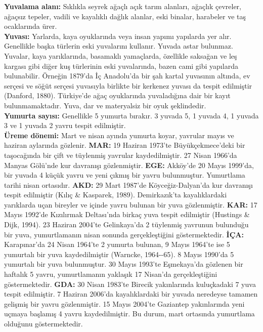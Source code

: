 \documentclass[
  10.5pt,
  a4paper,
  DIV=11,
  numbers=noendperiod,
  twocolumn]{scrreprt}
\begin{document}
\textbf{Yuvalama alanı:} Sıklıkla seyrek ağaçlı açık tarım alanları,
ağaçlık çevreler, ağaçsız tepeler, vadili ve kayalıklı dağlık alanlar,
eski binalar, harabeler ve taş ocaklarında ürer.\\
\textbf{Yuvası:} Yarlarda, kaya oyuklarında veya insan yapımı yapılarda
yer alır. Genellikle başka türlerin eski yuvalarını kullanır. Yuvada
astar bulunmaz. Yuvalar, kaya yarıklarında, basamaklı yamaçlarda,
özellikle saksağan ve leş kargası gibi diğer kuş türlerinin eski
yuvalarında, bazen cami gibi yapılarda bulunabilir. Örneğin 1879'da İç
Anadolu'da bir şah kartal yuvasının altında, ev serçesi ve söğüt serçesi
yuvasıyla birlikte bir kerkenez yuvası da tespit edilmiştir (Danford,
1880). Türkiye'de ağaç oyuklarında yuvaladığına dair bir kayıt
bulunmamaktadır. Yuva, dar ve materyalsiz bir oyuk şeklindedir.\\
\textbf{Yumurta sayısı:} Genellikle 5 yumurta bırakır. 3 yuvada 5, 1
yuvada 4, 1 yuvada 3 ve 1 yuvada 2 yavru tespit edilmiştir.\\
\textbf{Üreme dönemi:} Mart ve nisan ayında yumurta koyar, yavrular
mayıs ve haziran aylarında gözlenir. \textbf{MAR:} 19 Haziran 1973'te
Büyükçekmece'deki bir taşocağında bir çift ve tüylenmiş yavrular
kaydedilmiştir. 27 Nisan 1966'da Manyas Gölü'nde kur davranışı
gözlenmiştir. \textbf{EGE:} Akköy'de 20 Mayıs 1999'da, bir yuvada 4
küçük yavru ve yeni çıkmış bir yavru bulunmuştur. Yumurtlama tarihi
nisan ortasıdır. \textbf{AKD:} 29 Mart 1987'de Köyceğiz-Dalyan'da kur
davranışı tespit edilmiştir (Kılıç \& Kasparek, 1989). Demirkazık'ta
kayalıklardaki yarıklarda uçan bireyler ve içinde yavru bulunan bir yuva
gözlenmiştir. \textbf{KAR:} 17 Mayıs 1992'de Kızılırmak Deltası'nda
birkaç yuva tespit edilmiştir (Hustings \& Dijk, 1994). 23 Haziran
2004'te Gelinkaya'da 2 tüylenmiş yavrunun bulunduğu bir yuva,
yumurtlamanın nisan sonunda gerçekleştiğini göstermektedir.
\textbf{İÇA:} Karapınar'da 24 Nisan 1964'te 2 yumurta bulunan, 9 Mayıs
1964'te ise 5 yumurtalı bir yuva kaydedilmiştir (Warncke, 1964-\/-65). 8
Mayıs 1990'da 5 yumurtalı bir yuva bulunmuştur. 30 Mayıs 1993'te
Eşmekaya'da gözlenen bir haftalık 5 yavru, yumurtlamanın yaklaşık 17
Nisan'da gerçekleştiğini göstermektedir. \textbf{GDA:} 30 Nisan 1983'te
Birecik yakınlarında kuluçkadaki 7 yuva tespit edilmiştir. 7 Haziran
2006'da kayalıklardaki bir yuvada neredeyse tamamen gelişmiş bir yavru
gözlenmiştir. 15 Mayıs 2004'te Gaziantep yakınlarında yeni uçmaya
başlamış 4 yavru kaydedilmiştir. Bu durum, mart ortasında yumurtlama
olduğunu göstermektedir.
\end{document}
